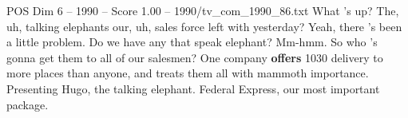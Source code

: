 \begin{textsample}{POS Dim 6 – 1990 – Score 1.00 – 1990/tv\_com\_1990\_86.txt}  \label{ex:f6_pos_075}
What 's up?
The, uh, talking elephants our, uh, sales force left with yesterday?
Yeah, there 's been a little problem.
Do we have any that speak elephant?
Mm-hmm.
So who 's gonna get them to all of our salesmen?
One company \textbf{offers} 1030 delivery to more places than anyone, and treats them all with mammoth importance.
Presenting Hugo, the talking elephant.
Federal Express, our most important package.

\end{textsample}
